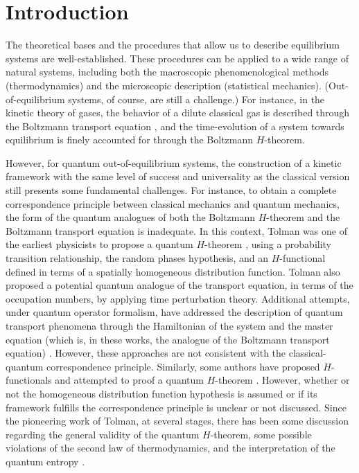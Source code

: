 \section{Introduction}

The theoretical bases and the procedures that allow us to describe equilibrium systems
are well-established. These procedures can be applied to a wide range of natural systems,
including both the macroscopic phenomenological methods (thermodynamics)
and the microscopic description (statistical mechanics).
(Out-of-equilibrium systems, of course, are still a challenge.)
For instance,
in the kinetic theory of gases, the behavior of a dilute classical gas
is described through the Boltzmann transport equation \cite{bib:huang},
and the time-evolution of a system towards equilibrium is finely accounted for
through the Boltzmann $H$-theorem.

However, for quantum out-of-equilibrium systems, the construction of a
kinetic framework with the same level of
success and universality as the classical version still presents some fundamental challenges. For instance,
to obtain a complete correspondence principle between classical mechanics
and quantum mechanics, the form of the quantum analogues of both the Boltzmann $H$-theorem
and the Boltzmann transport equation is inadequate.
In this context, Tolman was one of the earliest physicists to propose a quantum
$H$-theorem \cite{bib:tolman}, using a probability transition relationship, the random
phases hypothesis, and an $H$-functional defined in terms of a spatially homogeneous distribution function.
Tolman also proposed a potential quantum analogue of the transport equation,
in terms of the occupation numbers,
by applying time perturbation theory. Additional attempts, under quantum operator
formalism, have addressed the description of quantum transport phenomena through the Hamiltonian
of the system and the master equation (which is, in these works, the analogue
of the Boltzmann transport equation)
\cite{bib:grabert1974,%
bib:angel2017,
bib:amato2020,bib:nicacio2015,bib:hussein2014}. However, these approaches 
are not consistent with the classical-quantum correspondence principle.
Similarly, some authors have proposed $H$-functionals
and attempted to proof a
quantum $H$-theorem \cite{bib:gorban2014,bib:bennaim2017,bib:silva2010,%
bib:deroeck2006,bib:acharya2019,bib:kastner2017,bib:han2015,bib:das2018,bib:vonneumann2010}.
However, whether or not the homogeneous distribution function hypothesis is assumed or
if its framework fulfills the correspondence principle is unclear or not discussed.
Since the pioneering work of Tolman, at several stages, there has been some discussion regarding
the general validity of the quantum $H$-theorem,
some possible violations of the second law of thermodynamics, and the
interpretation of the quantum entropy  %
\cite{bib:silva2010,bib:acharya2019,bib:kastner2017,bib:han2015,bib:brown2008,%
bib:dragoljub2009,bib:vonneumann2010,%
bib:syros1999,bib:lesovik2016,
bib:lesovik2019}.

